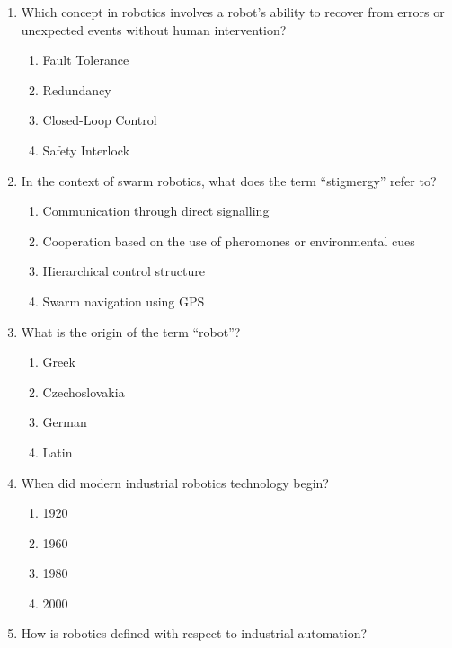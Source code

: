 \documentclass[11pt,a4paper]{article}
\begin{document}
\begin{enumerate}[label=(\roman*),leftmargin=*,itemsep=8pt]
  \item Which concept in robotics involves a robot's ability to recover from errors or unexpected events without human intervention?
  
\begin{enumerate}[label=(\alph*),itemsep=2pt]
    \item Fault Tolerance
    \item Redundancy
    \item Closed-Loop Control
    \item Safety Interlock
  \end{enumerate}

  \item In the context of swarm robotics, what does the term ``stigmergy'' refer to?
  
\begin{enumerate}[label=(\alph*),itemsep=2pt]
    \item Communication through direct signalling
    \item Cooperation based on the use of pheromones or environmental cues
    \item Hierarchical control structure
    \item Swarm navigation using GPS
  \end{enumerate}

  \item What is the origin of the term ``robot''?
  
\begin{enumerate}[label=(\alph*),itemsep=2pt]
    \item Greek
    \item Czechoslovakia
    \item German
    \item Latin
  \end{enumerate}

  \item When did modern industrial robotics technology begin?
  
\begin{enumerate}[label=(\alph*),itemsep=2pt]
    \item 1920
    \item 1960
    \item 1980
    \item 2000
  \end{enumerate}

  \item How is robotics defined with respect to industrial automation?
  

\end{enumerate}
\end{document}
